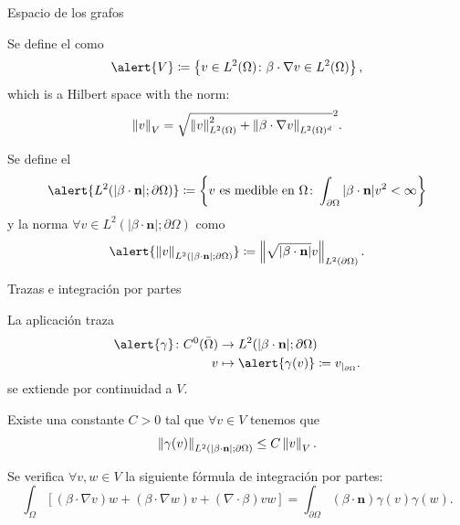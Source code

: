 	\begin{frame}{Espacio de los grafos}
	
	\begin{definicion}
	Se define el  como $$\alert{V}\coloneqq\left\{v\in L^2(\Omega)\colon\beta\cdot\nabla v\in L^2(\Omega) \right\},$$
	which is a Hilbert space with the norm:
	$$
	\left\|v\right\|_V=\sqrt{\left\|v\right\|_{L^2(\Omega)}^2+\left\|\beta\cdot\nabla v\right\|_{L^2(\Omega)^d}}^2.
	$$
	\end{definicion}
	
	\begin{definicion}
	Se define el  $$\alert{L^2(|\beta\cdot\mathbf{n}|;\partial\Omega)}\coloneqq\left\{v\text{ es medible en }\Omega\colon\int_{\partial\Omega}|\beta\cdot\mathbf{n}|v^2<\infty \right\}$$ y la norma $\forall v\in L^2(|\beta\cdot\mathbf{n}|;\partial\Omega)$ como $$\alert{\norma{v}_{L^2(|\beta\cdot\mathbf{n}|;\partial\Omega)}}\coloneqq\norma{\sqrt{|\beta\cdot\mathbf{n}|}v}_{L^2(\partial\Omega)}.$$
	\end{definicion}
	\end{frame}
	\begin{frame}{Trazas e integración por partes}
	\begin{lemma}
	La aplicación traza
	\begin{align*}
	\alert{\gamma}\colon {C}^0(\bar{\Omega})&\to L^2(|\beta\cdot\mathbf{n}|;\partial\Omega)\\
	v	&\mapsto\alert{\gamma(v)}\coloneqq v_{|_{\partial\Omega}}.
	\end{align*}
	se extiende por continuidad a $V$.
	 
	Existe una constante $C>0$ tal que $\forall v\in V$ tenemos que $$\left\|\gamma(v)\right\|_{L^2(|\beta\cdot\mathbf{n}|;\partial \Omega)}\leq C\left\|v\right\|_V.$$
	
	Se verifica $\forall v,w\in V$ la siguiente fórmula de integración por partes: $$\int_\Omega\left[(\beta\cdot\nabla v)w+(\beta\cdot\nabla w)v+(\nabla\cdot\beta)vw\right]=\int_{\partial\Omega}(\beta\cdot \mathbf{n})\gamma(v)\gamma(w).$$
	\end{lemma}
	
	\end{frame}
	
